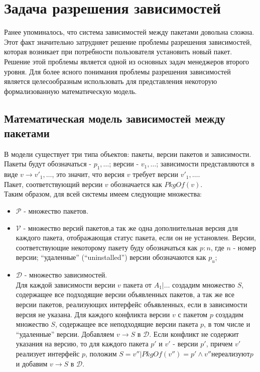 \section{Задача разрешения зависимостей}
Ранее упоминалось, что система зависимостей между пакетами довольна сложна. Этот факт 
значительно затрудняет решение проблемы разрешения зависимостей, которая возникает
при потребности пользователя установить новый пакет. Решение этой проблемы является одной
из основных задач менеджеров второго уровня.
Для более ясного понимания проблемы разрешения зависимостей является целесообразным использовать
для представления некоторую формализованную математическую модель.

\subsection{Математическая модель зависимостей между пакетами}

В модели существует три типа объектов: пакеты, версии пакетов и зависимости.
Пакеты будут обозначаться - $p_1, \dots$; версии - $v_1, \dots$; зависимости 
представляются в виде $v \to {v'_1, \dots}$, это значит, что версия $v$ требует
версии ${v'_1, \dots}$. \\
Пакет, соответствующий версии $v$ обозначается как $PkgOf(v)$.\\
Таким образом, для всей системы имеем следующие множества:
\begin{itemize}
\item{
$\mathcal{P}$ - множество пакетов.
}
\item{
$\mathcal{V}$ - множество версий пакетов,а так же одна дополнительная версия для каждого пакета,
отображающая статус пакета, если он не установлен. Версии, соответствующие некоторому пакету
буду обозначаться как $p: n$, где $n$ - номер версии; ``удаленные'' (``uninstalled'') версии
обозначаются как $p_u$;
}
\item{
$\mathcal{D}$ - множество зависимостей.\\
 Для каждой зависимости версии $v$ пакета от $A_1 | \dots$
создадим множество $S$, содержащее все подходящие версии объявленных пакетов, 
а так же все версии пакетов, реализующих интерфейс объявленных, если в зависимости 
версия не указана.
Для каждого конфликта версии $v$ с пакетом $p$ создадим множество $S$, содержащее все
неподходящие версии пакета $p$, в том числе и ``удаленные'' версии. Добавляем $v \to S$
в $\mathcal{D}$. Если конфликт не содержит указания на версию, то для каждого пакета $p'$ и $v'$ -
версии $p'$, причем $v'$ реализует интерфейс $p$, положим $S = {v''|PkgOf(v'') = p' \wedge v'' не реализуют p} $
и добавим $v \to S$ в $\mathcal{D}$.
}
\end{itemize}

